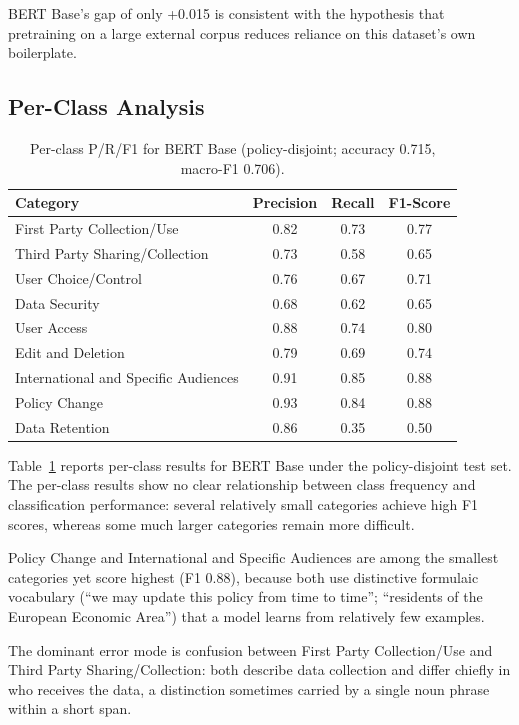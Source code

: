 \documentclass[11pt]{article}
\begin{document}
BERT Base's gap of only +0.015 is consistent with the hypothesis that pretraining on a large external corpus reduces reliance on this dataset's own boilerplate.

\subsection{Per-Class Analysis}

\begin{table}[t]
\centering
\footnotesize
\setlength{\tabcolsep}{3pt}
\begin{tabularx}{\columnwidth}{@{}Xccc@{}}
\toprule
\textbf{Category} & \textbf{Precision} & \textbf{Recall} & \textbf{F1-Score} \\
\midrule
First Party Collection/Use & 0.82 & 0.73 & 0.77 \\
Third Party Sharing/Collection & 0.73 & 0.58 & 0.65 \\
User Choice/Control & 0.76 & 0.67 & 0.71 \\
Data Security & 0.68 & 0.62 & 0.65 \\
User Access & 0.88 & 0.74 & 0.80 \\
Edit and Deletion & 0.79 & 0.69 & 0.74 \\
International and Specific Audiences & 0.91 & 0.85 & 0.88 \\
Policy Change & 0.93 & 0.84 & 0.88 \\
Data Retention & 0.86 & 0.35 & 0.50 \\
\bottomrule
\end{tabularx}
\caption{Per-class P/R/F1 for BERT Base (policy-disjoint; accuracy 0.715, macro-F1 0.706).}
\label{tab:perclass}
\end{table}

Table~\ref{tab:perclass} reports per-class results for BERT Base under the policy-disjoint test set. The per-class results show no clear relationship between class frequency and classification performance: several relatively small categories achieve high F1 scores, whereas some much larger categories remain more difficult.

Policy Change and International and Specific Audiences are among the smallest categories yet score highest (F1 0.88), because both use distinctive formulaic vocabulary (``we may update this policy from time to time''; ``residents of the European Economic Area'') that a model learns from relatively few examples.

The dominant error mode is confusion between First Party Collection/Use and Third Party Sharing/Collection: both describe data collection and differ chiefly in who receives the data, a distinction sometimes carried by a single noun phrase within a short span.
\end{document}
